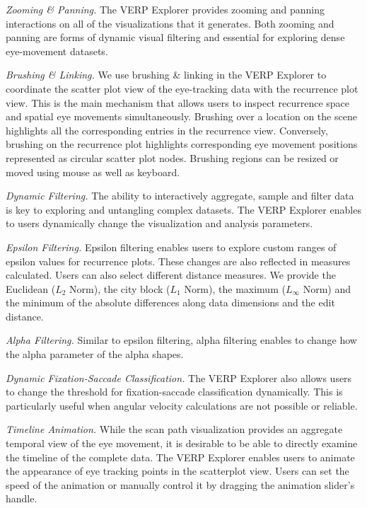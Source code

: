 \documentclass{sigchi}
\begin{document}
\emph{Zooming \& Panning.} The VERP Explorer provides zooming and panning
interactions on all of the visualizations that it generates. Both zooming
and panning are forms of dynamic visual filtering and essential for
exploring dense eye-movement datasets. 

\emph{Brushing \& Linking.} We use brushing \& linking in the VERP Explorer
to coordinate the scatter plot view of the eye-tracking data with the
recurrence plot view. This is the main mechanism that allows users to
inspect recurrence space and spatial eye movements simultaneously. Brushing
over a location on the scene highlights all the corresponding entries in
the recurrence view.  Conversely, brushing on the recurrence plot
highlights corresponding eye movement positions represented as circular
scatter plot nodes.  Brushing regions  can be resized or moved  using mouse
as well as keyboard.

\emph{Dynamic Filtering.} The ability to interactively aggregate, sample
and filter data is key to exploring and untangling complex datasets. The
VERP Explorer enables to users dynamically change the visualization and
analysis parameters. 

\emph{Epsilon Filtering.} Epsilon filtering enables users to explore custom
ranges of epsilon values  for recurrence plots. These changes are also
reflected in measures calculated.  Users can also select different distance
measures. We provide the Euclidean ($L_{2}$ Norm), the city block ($L_{1}$
Norm), the maximum ($L_{\infty}$ Norm) and the minimum of the absolute
differences along data dimensions and the edit distance.  

\emph{Alpha Filtering.} Similar to epsilon filtering, alpha filtering
enables to change how the alpha parameter of the alpha shapes. 

\emph{Dynamic Fixation-Saccade Classification.} The VERP Explorer also
allows users to change the threshold for fixation-saccade classification
dynamically. This is particularly useful when angular velocity calculations
are not possible or reliable. 

\emph{Timeline Animation.} While the scan path visualization provides an
aggregate temporal  view of the  eye movement, it is desirable to be able
to directly examine the timeline of the complete data.  The VERP Explorer
enables users to animate the appearance of eye tracking points in the
scatterplot view. Users can set the speed of the animation or manually
control it by dragging the animation slider’s handle. 
\end{document}
